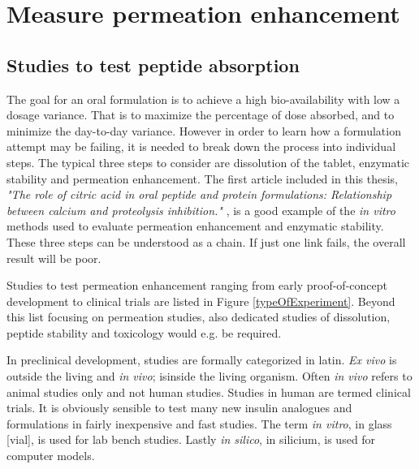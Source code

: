 \chapter{Measure permeation enhancement}

\section{Studies to test peptide absorption}
The goal for an oral formulation is to achieve a high bio-availability with low a dosage variance. That is to maximize the percentage of dose absorbed, and to minimize the day-to-day variance. However in order to learn how a formulation attempt may be failing, it is needed to break down the process into individual steps. The typical three steps to consider are dissolution of the tablet, enzymatic stability and permeation enhancement. The first article  included in this thesis, \textit{"The role of citric acid in oral peptide and protein formulations: Relationship between calcium and proteolysis inhibition."} \cite{welling2014citric}, is a good example of the \textit{in vitro} methods used to evaluate permeation enhancement and enzymatic stability. These three steps can be understood as a chain. If just one link fails, the overall result will be poor.

Studies to test permeation enhancement ranging from early proof-of-concept development to clinical trials are listed in Figure \ref{typeOfExperiment}. Beyond this list focusing on permeation studies, also dedicated studies of dissolution, peptide stability and toxicology would e.g. be required.

In preclinical development, studies are formally categorized in latin. \textit{Ex vivo} is outside the living and \textit{in vivo}; isinside the living organism. Often \textit{in vivo} refers to animal studies only and not human studies. Studies in human are termed clinical trials. It is obviously sensible to test many new insulin analogues and formulations in fairly inexpensive and fast studies. The term \textit{in vitro}, in glass [vial], is used for lab bench studies. Lastly \textit{in silico}, in silicium, is used for computer models.
 
